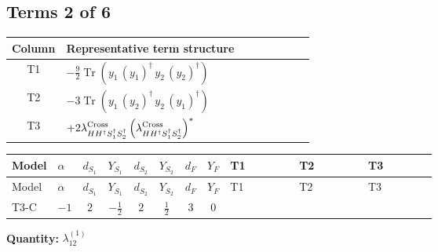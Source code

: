 \documentclass[8pt]{article}
\begin{document}
\begin{landscape}
\subsection*{Terms 2 of 6}
\begin{center}
\begin{tabular}{@{}c >{\raggedright\arraybackslash}p{0.82\linewidth}@{}}
\toprule
Column & Representative term structure \\
\midrule
T1 & \(\displaystyle -\frac{9}{2} \operatorname{Tr}\!\left({y_1}\,\left({y_1}\right)^{\dagger}\,{y_2}\,\left({y_2}\right)^{\dagger}\right)\) \\
\midrule
T2 & \(\displaystyle -3 \operatorname{Tr}\!\left({y_1}\,\left({y_2}\right)^{\dagger}\,{y_2}\,\left({y_1}\right)^{\dagger}\right)\) \\
\midrule
T3 & \(\displaystyle +2 {\lambda_{H H^\dagger S_1^\dagger S_2^\dagger}^{\rm Cross}} \left({\lambda_{H H^\dagger S_1^\dagger S_2^\dagger}^{\rm Cross}}\right)^{*}\) \\
\midrule
\bottomrule
\end{tabular}
\end{center}
\smallskip
\tiny
\begin{longtable}{@{}llcccccc >{\raggedright\arraybackslash}p{0.21\linewidth} >{\raggedright\arraybackslash}p{0.21\linewidth} >{\raggedright\arraybackslash}p{0.21\linewidth}@{}}
\toprule
Model & $\alpha$ & $d_{S_1}$ & $Y_{S_1}$ & $d_{S_2}$ & $Y_{S_2}$ & $d_F$ & $Y_F$ & T1 & T2 & T3 \\
\midrule
\endfirsthead
\toprule
Model & $\alpha$ & $d_{S_1}$ & $Y_{S_1}$ & $d_{S_2}$ & $Y_{S_2}$ & $d_F$ & $Y_F$ & T1 & T2 & T3 \\
\midrule
\endhead
T3-C & $-1$ & $2$ & $-\frac{1}{2}$ & $2$ & $\frac{1}{2}$ & $3$ & $0$ & \scriptsize\adjustbox{max width=\linewidth}{$\begin{gathered} -\frac{9}{2} \operatorname{Tr}\!\left({y_1}\,\left({y_1}\right)^{\dagger}\,{y_2}\,\left({y_2}\right)^{\dagger}\right)\end{gathered}$} & \scriptsize\adjustbox{max width=\linewidth}{$\begin{gathered} -3 \operatorname{Tr}\!\left({y_1}\,\left({y_2}\right)^{\dagger}\,{y_2}\,\left({y_1}\right)^{\dagger}\right)\end{gathered}$} & \scriptsize\adjustbox{max width=\linewidth}{$\begin{gathered} +2 {\lambda_{H H^\dagger S_1^\dagger S_2^\dagger}^{\rm Cross}} \left({\lambda_{H H^\dagger S_1^\dagger S_2^\dagger}^{\rm Cross}}\right)^{*}\end{gathered}$} \\
\midrule
\bottomrule
\end{longtable}
\clearpage
\noindent\textbf{Quantity: }$\lambda_{12}^{(1)}$\par\smallskip

\end{landscape}
\end{document}
